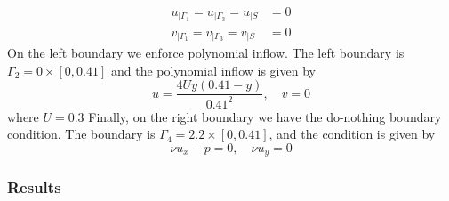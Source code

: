 \begin{align*}
    u_{|\Gamma_1} = u_{|\Gamma_3} = u_{|S} &= 0 \\
    v_{|\Gamma_1} = v_{|\Gamma_3} = v_{|S} &= 0
\end{align*}
On the left boundary we enforce polynomial inflow. The left boundary is $\Gamma_2 = 0\times [0,0.41]$ and the polynomial inflow is given by
\begin{equation*}
    u=\frac{4Uy(0.41-y)}{0.41^2}, \quad v=0
\end{equation*}
where $U=0.3$
Finally, on the right boundary we have the do-nothing boundary condition. The boundary is $\Gamma_4=2.2\times[0,0.41]$, and the condition is given by
\begin{equation*}
    \nu u_x - p = 0, \quad \nu u_y = 0
\end{equation*}
\subsubsection{Results}